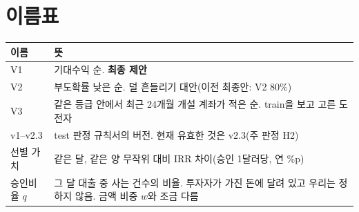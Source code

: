 \section*{이름표}
\begin{table}[H]\centering\small
\begin{tabularx}{\linewidth}{@{}p{26mm}L@{}}\toprule
이름 & 뜻\\\midrule
V1 & 기대수익 순. \textbf{최종 제안}\\
V2 & 부도확률 낮은 순. 덜 흔들리기 대안(이전 최종안: V2 80\%)\\
V3 & 같은 등급 안에서 최근 24개월 개설 계좌가 적은 순. train을 보고 고른 도전자\\
v1--v2.3 & test 판정 규칙서의 버전. 현재 유효한 것은 v2.3(주 판정 H2)\\
선별 가치 & 같은 달, 같은 양 무작위 대비 IRR 차이(승인 1달러당, 연 \%p)\\
승인비율 $q$ & 그 달 대출 중 사는 건수의 비율. 투자자가 가진 돈에 달려 있고 우리는 정하지 않음. 금액 비중 $w$와 조금 다름\\\bottomrule
\end{tabularx}
\end{table}
\endgroup
